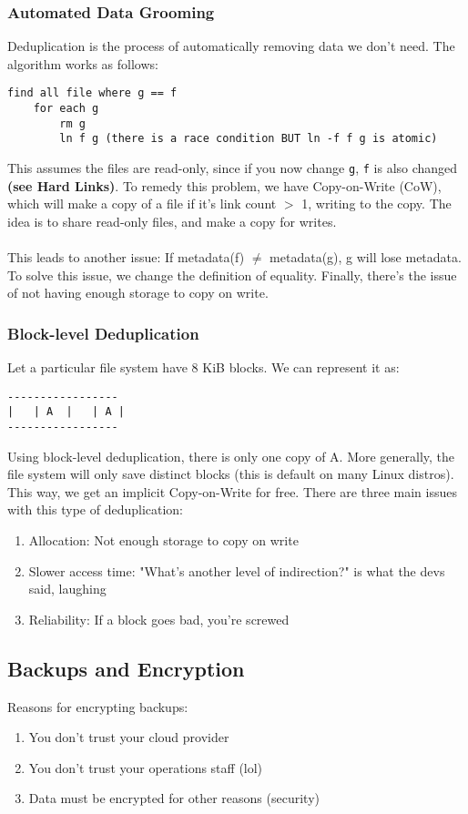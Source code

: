 \documentclass[13pt]{article}
\begin{document}
\subsubsection{Automated Data Grooming}
Deduplication is the process of automatically removing data we don't need. The algorithm works as follows:
\begin{verbatim}
find all file where g == f
    for each g
        rm g
        ln f g (there is a race condition BUT ln -f f g is atomic)
\end{verbatim}
This assumes the files are read-only, since if you now change \texttt{g}, \texttt{f} is also changed \textbf{(see Hard Links)}. To remedy this problem, we have Copy-on-Write (CoW), which will make a copy of a file if it's link count $>$ 1, writing to the copy. The idea is to share read-only files, and make a copy for writes. \\ \\
This leads to another issue: If metadata(f) $\neq$ metadata(g), g will lose metadata. To solve this issue, we change the definition of equality. Finally, there's the issue of not having enough storage to copy on write.

\subsubsection*{Block-level Deduplication}
Let a particular file system have 8 KiB blocks. We can represent it as:
\begin{verbatim}
-----------------
|   | A  |   | A |
-----------------
\end{verbatim}
Using block-level deduplication, there is only one copy of A. More generally, the file system will only save distinct blocks (this is default on many Linux distros). This way, we get an implicit Copy-on-Write for free. There are three main issues with this type of deduplication:
\begin{enumerate}[label=(\arabic*)]
\item Allocation: Not enough storage to copy on write
\item Slower access time: "What's another level of indirection?" is what the devs said, laughing
\item Reliability: If a block goes bad, you're screwed
\end{enumerate}

\subsection{Backups and Encryption}
Reasons for encrypting backups:
\begin{enumerate}[label=(\arabic*)]
\item You don't trust your cloud provider
\item You don't trust your operations staff (lol)
\item Data must be encrypted for other reasons (security)
\end{enumerate}
\end{document}
